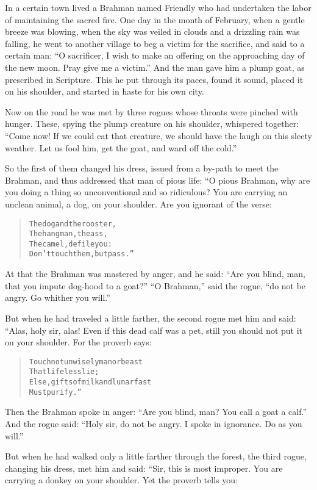 \documentclass[article, twoside, 14pt]{memoir}
\renewenvironment{verbatim}{%
\begin{quote}%
\vskip -10pt%
\begin{alltt}\normalfont\large}{\end{alltt}%
\end{quote}%
\vskip -10pt
} %
\begin{document}
\label{s51}

In a certain town lived a Brahman named Friendly who had undertaken
the labor of maintaining the sacred fire. One day in the month of
February, when a gentle breeze was blowing, when the sky was veiled
in clouds and a drizzling rain was falling, he went to another
village to beg a victim for the sacrifice, and said to a certain
man:
``O sacrificer, I wish to make an offering on the approaching day of the new moon. Pray give me a victim.''
And the man gave him a plump goat, as prescribed in Scripture. This
he put through its paces, found it sound, placed it on his
shoulder, and started in haste for his own city.

Now on the road he was met by three rogues whose throats were
pinched with hunger. These, spying the plump creature on his
shoulder, whispered together:
``Come now! If we could eat that creature, we should have the laugh on this sleety weather. Let us fool him, get the goat, and ward off the cold.''

So the first of them changed his dress, issued from a by-path to
meet the Brahman, and thus addressed that man of pious life: “O
pious Brahman, why are you doing a thing so unconventional and so
ridiculous? You are carrying an unclean animal, a dog, on your
shoulder. Are you ignorant of the verse:

\begin{verbatim}
The dog and the rooster,
The hangman, the ass,
The camel, defile you:
Don't touch them, but pass.”
\end{verbatim}
At that the Brahman was mastered by anger, and he said:
``Are you blind, man, that you impute dog-hood to a goat?''
``O Brahman,'' said the rogue,
``do not be angry. Go whither you will.''

But when he had traveled a little farther, the second rogue met him
and said: “Alas, holy sir, alas! Even if this dead calf was a pet,
still you should not put it on your shoulder. For the proverb
says:

\begin{verbatim}
Touch not unwisely man or beast
    That lifeless lie;
Else, gifts of milk and lunar fast
    Must purify.”
\end{verbatim}
Then the Brahman spoke in anger:
``Are you blind, man? You call a goat a calf.'' And the rogue said:
``Holy sir, do not be angry. I spoke in ignorance. Do as you will.''

But when he had walked only a little farther through the forest,
the third rogue, changing his dress, met him and said: “Sir, this
is most improper. You are carrying a donkey on your shoulder. Yet
the proverb tells you:
\end{document}
